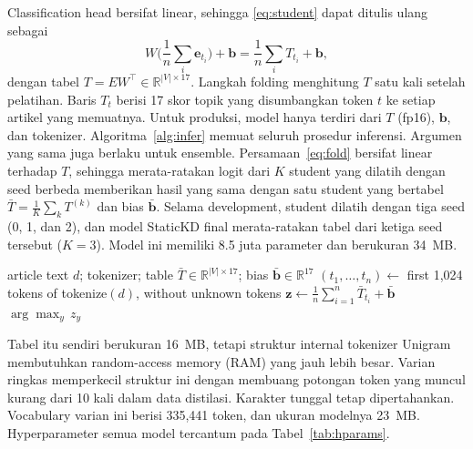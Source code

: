 \documentclass[journal]{IEEEtran}
\begin{document}
Classification head bersifat linear, sehingga \eqref{eq:student} dapat ditulis ulang sebagai
\begin{equation}
W\Big(\frac{1}{n}\sum_{i}\mathbf{e}_{t_i}\Big)+\mathbf{b}=\frac{1}{n}\sum_{i}T_{t_i}+\mathbf{b},
\label{eq:fold}
\end{equation}
dengan tabel $T=EW^{\top}\in\mathbb{R}^{|V|\times 17}$. Langkah folding menghitung $T$ satu kali setelah pelatihan. Baris $T_t$ berisi 17 skor topik yang disumbangkan token $t$ ke setiap artikel yang memuatnya. Untuk produksi, model hanya terdiri dari $T$ (fp16), $\mathbf{b}$, dan tokenizer. Algoritma~\ref{alg:infer} memuat seluruh prosedur inferensi. Argumen yang sama juga berlaku untuk ensemble. Persamaan~\eqref{eq:fold} bersifat linear terhadap $T$, sehingga merata-ratakan logit dari $K$ student yang dilatih dengan seed berbeda memberikan hasil yang sama dengan satu student yang bertabel $\bar{T}=\frac{1}{K}\sum_k T^{(k)}$ dan bias $\bar{\mathbf{b}}$. Selama development, student dilatih dengan tiga seed (0, 1, dan 2), dan model StaticKD final merata-ratakan tabel dari ketiga seed tersebut ($K=3$). Model ini memiliki 8.5 juta parameter dan berukuran 34~MB.

\begin{algorithm}[!t]
\caption{StaticKD Inference for One Article}
\label{alg:infer}
\begin{algorithmic}[1]
\Require article text $d$; tokenizer; table $\bar{T}\in\mathbb{R}^{|V|\times 17}$; bias $\bar{\mathbf{b}}\in\mathbb{R}^{17}$
\State $(t_1,\dots,t_n)\gets$ first 1,024 tokens of tokenize$(d)$, without unknown tokens
\State $\mathbf{z}\gets\frac{1}{n}\sum_{i=1}^{n}\bar{T}_{t_i}+\bar{\mathbf{b}}$ 
\State \Return $\arg\max_{y}\,z_y$ 
\end{algorithmic}
\end{algorithm}

Tabel itu sendiri berukuran 16~MB, tetapi struktur internal tokenizer Unigram membutuhkan random-access memory (RAM) yang jauh lebih besar. Varian ringkas memperkecil struktur ini dengan membuang potongan token yang muncul kurang dari 10 kali dalam data distilasi. Karakter tunggal tetap dipertahankan. Vocabulary varian ini berisi 335,441 token, dan ukuran modelnya 23~MB. Hyperparameter semua model tercantum pada Tabel~\ref{tab:hparams}.
\end{document}
